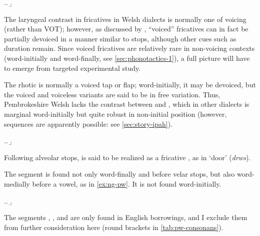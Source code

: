 \ex.\a.
\b.


The laryngeal contrast in fricatives in Welsh dialects is normally one of voicing (rather than VOT); however, as discussed \eg by \citet{ball01:_welsh_phonet}, \enquote{voiced} fricatives can in fact be partially devoiced in a manner similar to stops, although other cues such as duration remain. Since voiced fricatives are relatively rare in non\hyp voicing contexts (\eg word\hyp initially and word\hyp finally, see \cref{sec:phonotactics-1}), a full picture will have to emerge from targeted experimental study.

The rhotic \ipa{[r]} is normally a voiced tap or flap; word-initially, it may be devoiced, but the voiced and voiceless variants are said to be in free variation. Thus, Pembrokeshire Welsh lacks the contrast between \ipa{[r̥]} and \ipa{[r]}, which in other dialects is marginal word-initially but quite robust in non-initial position (however, \ipa{[rh]} sequences are apparently possible: see \cref{sec:story-ipah}).

\ex.\a.
\b.

Following alveolar stops, \ipa{[r]} is said to be realized as a fricative , as in  `door' (\emph{drws}).

The segment \ipa{[ŋ]} is found not only word-finally and before velar stops, but also word-medially before a vowel, as in \cref{ex:ng-pw}. It is not found word-initially.

\ex.\label{ex:ng-pw}\a.
\b.

The segments \ipa{[ʧ]}, \ipa{[dʒ]}, and \ipa{[z]} are only found in English borrowings, and I exclude them from further consideration here (round brackets in \cref{tab:pw-consonans}).

